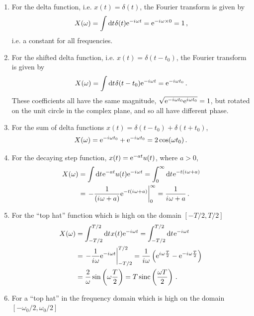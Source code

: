\begin{enumerate}
\item For the delta function, i.e. $x(t) = \delta(t)$, the Fourier transform is
  given by
  \begin{displaymath}
    X(\omega) = \int \mathrm{d}t\mkern1mu \delta(t)\mathrm{e}^{-{i\mkern1mu}\omega t} = \mathrm{e}^{-{i\mkern1mu}\omega\times 0} = 1 \,,
  \end{displaymath}
  i.e. a constant for all frequencies.
\item For the shifted delta function, i.e. $x(t) = \delta(t-t_0)$, the Fourier transform
  is given by
  \begin{displaymath}
    X(\omega) = \int \mathrm{d}t\mkern1mu \delta(t-t_0)\mathrm{e}^{-{i\mkern1mu}\omega t} = \mathrm{e}^{-{i\mkern1mu}\omega t_0} \,.
  \end{displaymath}
  These coefficients all have the same magnitude, $\sqrt{\mathrm{e}^{-{i\mkern1mu}\omega t_0}\mathrm{e}^{{i\mkern1mu}\omega t_0}} = 1$,
  but rotated on the unit circle in the complex plane, and so all have different phase.
\item For the sum of delta functions $x(t) = \delta(t-t_0) + \delta(t+t_0)$,
  \begin{displaymath}
    X(\omega) = \mathrm{e}^{-{i\mkern1mu}\omega t_0} + \mathrm{e}^{-{i\mkern1mu}\omega t_0} = 2\cos(\omega t_0) \,.
  \end{displaymath}
\item For the decaying step function, $x(t) = \mathrm{e}^{-at}u(t)$, where $a > 0$,
  \begin{align*}
    X(\omega) &= \int \mathrm{d}t\mkern1mu \mathrm{e}^{-at}u(t)\mathrm{e}^{-{i\mkern1mu}\omega t} = \int_0^\infty\mathrm{d}t\mkern1mu \mathrm{e}^{-t({i\mkern1mu}\omega + a)} \\
    &= \left.-\frac{1}{({i\mkern1mu}\omega + a)} \mathrm{e}^{-t({i\mkern1mu}\omega + a)}\right|_0^\infty = \frac{1}{{i\mkern1mu}\omega + a} \,.
  \end{align*}
\item For the ``top hat'' function which is high on the domain $[-T/2,T/2]$
  \begin{align*}
    X(\omega) &= \int_{-T/2}^{T/2}\mathrm{d}t\mkern1mux(t)\mathrm{e}^{-{i\mkern1mu}\omega t} = \int_{-T/2}^{T/2}\mathrm{d}t\mkern1mu\mathrm{e}^{-{i\mkern1mu}\omega t} \\
    &= \left.-\frac{1}{{i\mkern1mu}\omega} \mathrm{e}^{-{i\mkern1mu}\omega t}\right|_{-T/2}^{T/2} = \frac{1}{{i\mkern1mu}\omega}
    \left(\mathrm{e}^{{i\mkern1mu}\omega\frac{T}{2}} - \mathrm{e}^{-{i\mkern1mu}\omega\frac{T}{2}}\right) \\
    &= \frac{2}{\omega}\sin\left(\omega\frac{T}{2}\right) = T\operatorname{sinc}\left(\frac{\omega T}{2}\right) \,.
  \end{align*}
\item For a ``top hat'' in the frequency domain which is high on the domain $[-\omega_0/2,\omega_0/2]$

\end{enumerate}
